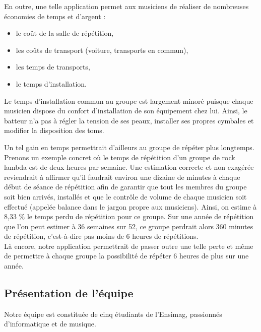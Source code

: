\documentclass[a4,12pt]{article}
\begin{document}
En outre, une telle application permet aux musiciens de réaliser de nombreuses
économies de temps et d'argent :

\begin{itemize}
\item le coût de la salle de répétition,
\item les coûts de transport (voiture, transports en commun),
\item les temps de transports,
\item le temps d'installation.
\end{itemize}

Le temps d'installation commun au groupe est largement minoré puisque chaque
musicien dispose du confort d'installation de son équipement chez lui. Ainsi, le
batteur n'a pas à régler la tension de ses peaux, installer ses propres cymbales
et modifier la disposition des toms.

Un tel gain en temps permettrait d'ailleurs au groupe de répéter plus longtemps. Prenons
un exemple concret où le temps de répétition d'un groupe de rock lambda est de deux heures
par semaine. Une estimation correcte et non exagérée reviendrait à affirmer qu'il faudrait
environ une dizaine de minutes à chaque début de séance de répétition afin de garantir que
tout les membres du groupe soit bien arrivés, installés et que le contrôle de volume de
chaque musicien soit effectué (appelée balance dans le jargon propre aux musiciens). Ainsi,
on estime à 8,33 \% le temps perdu de répétition pour ce groupe. Sur une année de répétition
que l'on peut estimer à 36 semaines sur 52, ce groupe perdrait alors 360 minutes de
répétition, c'est-à-dire pas moins de 6 heures de répétitions.\\

Là encore, notre application permettrait de passer outre une telle perte et même de
permettre à chaque groupe la possibilité de répéter 6 heures de plus sur une année.

\subsection{Présentation de l'équipe}

Notre équipe est constituée de cinq étudiants de l'Ensimag, passionnés d'informatique
et de musique.
\end{document}
